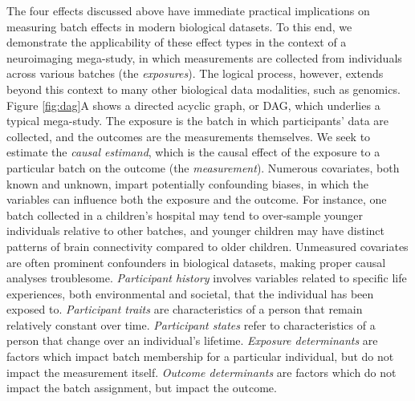 The four effects discussed above have immediate practical implications on measuring batch effects in modern biological datasets. To this end, we demonstrate the applicability of these effect types in the context of a neuroimaging mega-study, in which measurements are collected from individuals across various batches (the \textit{exposures}). The logical process, however, extends beyond this context to many other biological data modalities, such as genomics. Figure \ref{fig:dag}A shows a directed acyclic graph, or DAG, which underlies a typical mega-study. The exposure is the batch in which participants' data are collected, and the outcomes are the measurements themselves. We seek to estimate the \textit{causal estimand}, which is the causal effect of the exposure to a particular batch on the outcome (the \textit{measurement}). Numerous covariates, both known and unknown, impart potentially confounding biases, in which the variables can influence both the exposure and the outcome.
For instance, one batch collected in a children's hospital may tend to over-sample younger individuals relative to other batches, and younger children may have distinct patterns of brain connectivity compared to older children. {} Unmeasured covariates are often prominent confounders in biological datasets, making proper causal analyses troublesome. \textit{Participant history} involves variables related to specific life experiences, both environmental and societal, that the individual has been exposed to. \textit{Participant traits} are characteristics of a person that remain relatively constant over time. \textit{Participant states} refer to characteristics of a person that change over an individual's lifetime. \textit{Exposure determinants} are factors which impact batch membership for a particular individual, but do not impact the measurement itself. \textit{Outcome determinants} are factors which do not impact the batch assignment, but impact the outcome.

